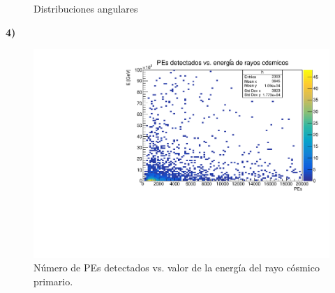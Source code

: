 \documentclass[11pt]{article}
\begin{document}
\begin{figure}[H]
\centering
{}

\caption{Distribuciones angulares}
\end{figure}
\pagebreak

\textbf{4)}
\begin{figure}[H]
\centering
\includegraphics[width=1\textwidth]{../Figuras/Prob4A.pdf}
\caption{Número de PEs detectados vs. valor de la energía del rayo cósmico primario.}
\end{figure}
\end{document}

